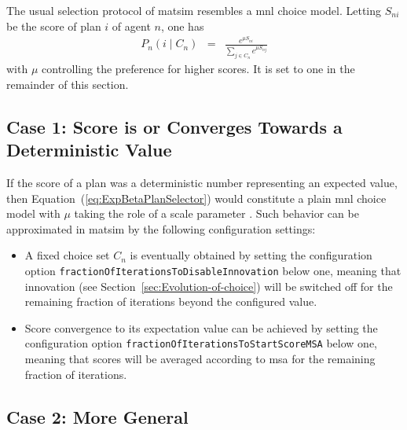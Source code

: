 The usual selection protocol of \gls{matsim} resembles a \gls{mnl}
choice model. Letting $S_{ni}$ be the score of plan $i$ of agent
$n$, one has
\begin{eqnarray}
P_{n}(i\mid C_{n}) & = & \frac{e^{\mu S_{ni}}}{\sum_{j\in C_{n}}e^{\mu S_{nj}}}\label{eq:ExpBetaPlanSelector}
\end{eqnarray}
with $\mu$ controlling the preference for higher scores.
It is set to one in the remainder of this section. 

\subsection{Case 1: Score is or Converges Towards a Deterministic Value}
\label{sec:score-is-converged}

If the score of a plan was a deterministic number representing an expected
value, then Equation~(\ref{eq:ExpBetaPlanSelector}) would constitute a plain
\gls{mnl} choice model with $\mu$ taking the role of a scale parameter
\citep[see, e.g.,][p.45]{Train_2003}.
Such behavior can be approximated in \acrshort{matsim} by the following
configuration settings:
\begin{itemize}
\styleItemize
\item A fixed choice set $C_n$ is eventually obtained by setting the configuration 
option \verb$fractionOfIterationsToDisableInnovation$ below one,  
meaning that innovation (see Section~\ref{sec:Evolution-of-choice}) will be
switched off for the remaining fraction of iterations beyond the configured value.
\item Score convergence to its expectation value can be achieved by setting 
the configuration option \verb$fractionOfIterationsToStartScoreMSA$ below one, 
meaning that scores will be averaged
according to  \gls{msa}
for the remaining fraction of iterations.
\end{itemize}
%


\subsection{Case 2: More General}
\label{sec:more-general-choice}

